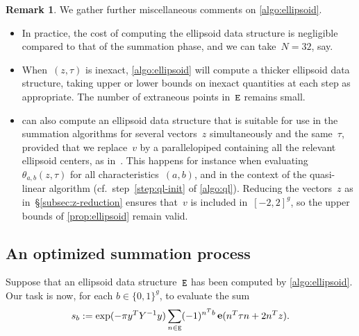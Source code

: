 \documentclass[12pt,oneside]{amsart}
\numberwithin{equation}{section}
\theoremstyle{definition}
\newtheorem{rem}[equation]{Remark}
\DeclareMathOperator{\E}{\tt E}
\DeclareMathOperator{\e}{\mathbf{e}}
\begin{document}
\begin{rem}
  \label{rem:wider-ellipsoid}
  We gather further miscellaneous comments on \cref{algo:ellipsoid}.
  \begin{itemize}
  \item In practice, the cost of computing the ellipsoid data structure is
    negligible compared to that of the summation phase, and we can take~$N=32$,
    say.
  \item When~$(z,\tau)$ is inexact, \cref{algo:ellipsoid} will compute a
    thicker ellipsoid data structure, taking upper or lower bounds on inexact
    quantities at each step as appropriate. The number of extraneous points
    in~$\E$ remains small.
  \item {} can also compute an ellipsoid data structure that
    is suitable for use in the summation algorithms for several vectors~$z$
    simultaneously and the same~$\tau$, provided that we replace~$v$ by a
    parallelopiped containing all the relevant ellipsoid centers, as
    in~\cite[§5]{deconinckComputingRiemannTheta2004}.  This happens for
    instance when evaluating~$\theta_{a,b}(z,\tau)$ for all
    characteristics~$(a,b)$, and in the context of the quasi-linear algorithm
    (cf.~step~\eqref{step:ql-init} of \cref{algo:ql}). Reducing the vectors~$z$
    as in~§\ref{subsec:z-reduction} ensures that~$v$ is included in~$[-2,2]^g$,
    so the upper bounds of \cref{prop:ellipsoid} remain valid.
  \end{itemize}
\end{rem}

\subsection{An optimized summation process}
\label{subsec:sum}

Suppose that an ellipsoid data structure~$\E$ has been computed by
\cref{algo:ellipsoid}. Our task is now, for each $b\in \{0,1\}^g$, to evaluate
the sum
\begin{equation}
  \label{eq:Sb}
  s_b := \exp(-\pi y^T Y^{-1}y) \sum_{n\in \E} (-1)^{n^T b} \e(n^T\tau n + 2n^T z).
\end{equation}
\end{document}
